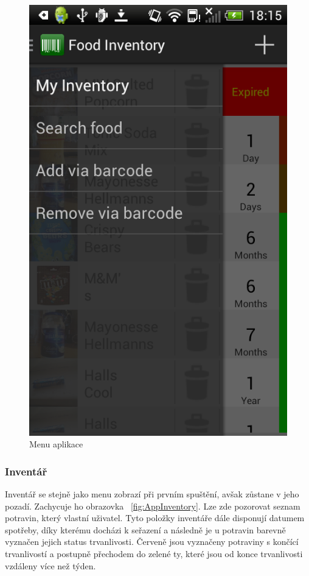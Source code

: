 \documentclass[thesis=B,czech]{FITthesis}[2013/10/20]
\begin{document}
\begin{figure}[H]
  \centering
  \includegraphics[scale=0.4]{screenshots/app_menu.png}
  \caption{Menu aplikace}
  \label{fig:AppMenu}
\end{figure}

\clearpage

\subsubsection{Inventář}

Inventář se stejně jako menu zobrazí při prvním spuštění, avšak zůstane v jeho pozadí. Zachycuje ho obrazovka ~\ref{fig:AppInventory}. Lze zde pozorovat seznam potravin, který vlastní uživatel. Tyto položky inventáře dále disponují datumem spotřeby, díky kterému docházi k seřazení a následně je u potravin barevně vyznačen jejich status trvanlivosti. Červeně jsou vyznačeny potraviny s končící trvanlivostí a postupně přechodem do zelené ty, které jsou od konce trvanlivosti vzdáleny více než týden.
\end{document}
